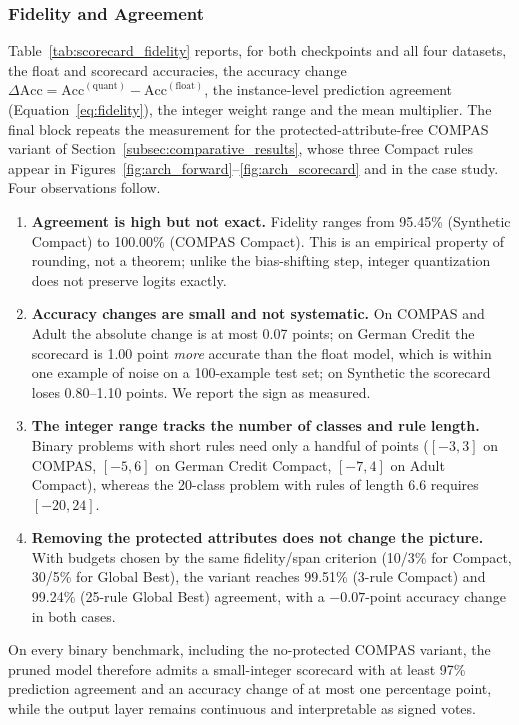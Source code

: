 \subsubsection{Fidelity and Agreement}
Table~\ref{tab:scorecard_fidelity} reports, for both checkpoints and all four
datasets, the float and scorecard accuracies, the accuracy change
$\Delta\text{Acc} = \text{Acc}^{(\text{quant})} - \text{Acc}^{(\text{float})}$,
the instance-level prediction agreement (Equation~\ref{eq:fidelity}), the integer
weight range and the mean multiplier. The final block repeats the measurement for
the protected-attribute-free COMPAS variant of
Section~\ref{subsec:comparative_results}, whose three Compact rules appear in
Figures~\ref{fig:arch_forward}--\ref{fig:arch_scorecard} and in the case study.
Four observations follow.
\begin{enumerate}
    \item \textbf{Agreement is high but not exact.} Fidelity ranges from 95.45\%
    (Synthetic Compact) to 100.00\% (COMPAS Compact). This is an empirical
    property of rounding, not a theorem; unlike the bias-shifting step, integer
    quantization does not preserve logits exactly.
    \item \textbf{Accuracy changes are small and not systematic.} On COMPAS and
    Adult the absolute change is at most 0.07 points; on German Credit the
    scorecard is 1.00 point \emph{more} accurate than the float model, which is
    within one example of noise on a 100-example test set; on Synthetic the
    scorecard loses 0.80--1.10 points. We report the sign as measured.
    \item \textbf{The integer range tracks the number of classes and rule
    length.} Binary problems with short rules need only a handful of points
    ($[-3,3]$ on COMPAS, $[-5,6]$ on German Credit Compact, $[-7,4]$ on Adult
    Compact), whereas the 20-class problem with rules of length 6.6 requires
    $[-20,24]$.
    \item \textbf{Removing the protected attributes does not change the picture.}
    With budgets chosen by the same fidelity/span criterion (10/3\% for Compact,
    30/5\% for Global Best), the variant reaches 99.51\% (3-rule Compact) and
    99.24\% (25-rule Global Best) agreement, with a $-0.07$-point accuracy change
    in both cases.
\end{enumerate}
On every binary benchmark, including the no-protected COMPAS variant, the pruned
model therefore admits a small-integer scorecard with at least 97\% prediction
agreement and an accuracy change of at most one percentage point, while the output
layer remains continuous and interpretable as signed votes.


